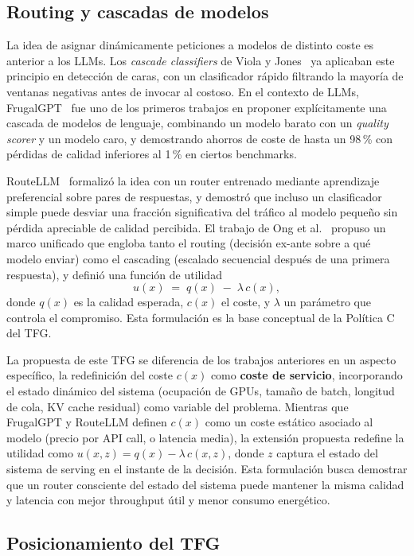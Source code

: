 \documentclass[11pt,a4paper]{article}
\begin{document}
\subsection{Routing y cascadas de modelos}

La idea de asignar dinámicamente peticiones a modelos de distinto coste es anterior a los LLMs. Los \textit{cascade classifiers} de Viola y Jones~\cite{viola2001cascade} ya aplicaban este principio en detección de caras, con un clasificador rápido filtrando la mayoría de ventanas negativas antes de invocar al costoso. En el contexto de LLMs, FrugalGPT~\cite{chen2023frugalgpt} fue uno de los primeros trabajos en proponer explícitamente una cascada de modelos de lenguaje, combinando un modelo barato con un \textit{quality scorer} y un modelo caro, y demostrando ahorros de coste de hasta un 98\,\% con pérdidas de calidad inferiores al 1\,\% en ciertos benchmarks.

RouteLLM~\cite{dekoninck2024routing} formalizó la idea con un router entrenado mediante aprendizaje preferencial sobre pares de respuestas, y demostró que incluso un clasificador simple puede desviar una fracción significativa del tráfico al modelo pequeño sin pérdida apreciable de calidad percibida. El trabajo de Ong et al.~\cite{ong2025routellm} propuso un marco unificado que engloba tanto el routing (decisión ex-ante sobre a qué modelo enviar) como el cascading (escalado secuencial después de una primera respuesta), y definió una función de utilidad
\[
u(x) \;=\; q(x) \;-\; \lambda\, c(x),
\]
donde $q(x)$ es la calidad esperada, $c(x)$ el coste, y $\lambda$ un parámetro que controla el compromiso. Esta formulación es la base conceptual de la Política C del TFG.

La propuesta de este TFG se diferencia de los trabajos anteriores en un aspecto específico, la redefinición del coste $c(x)$ como \textbf{coste de servicio}, incorporando el estado dinámico del sistema (ocupación de GPUs, tamaño de batch, longitud de cola, KV cache residual) como variable del problema. Mientras que FrugalGPT y RouteLLM definen $c(x)$ como un coste estático asociado al modelo (precio por API call, o latencia media), la extensión propuesta redefine la utilidad como $u(x,z) = q(x) - \lambda\,c(x,z)$, donde $z$ captura el estado del sistema de serving en el instante de la decisión. Esta formulación busca demostrar que un router consciente del estado del sistema puede mantener la misma calidad y latencia con mejor throughput útil y menor consumo energético.

\subsection{Posicionamiento del TFG}
\end{document}
